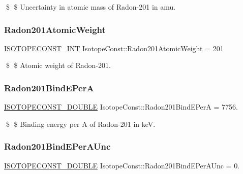 \$ \$ Uncertainty in atomic mass of Radon-\/201 in amu. \mbox{\label{group___isotope_const-_radon-_rn201_gaaece13a99d34e2d724ffe595dbc305bb}} 
\subsubsection{\texorpdfstring{Radon201\+Atomic\+Weight}{Radon201AtomicWeight}}
{\footnotesize\ttfamily \mbox{\hyperlink{group___isotope_const-_macros_ga5f18360b3e99483a35c32d789e62621c}{I\+S\+O\+T\+O\+P\+E\+C\+O\+N\+S\+T\+\_\+\+I\+NT}} Isotope\+Const\+::\+Radon201\+Atomic\+Weight = 201}

\$ \$ Atomic weight of Radon-\/201. \mbox{\label{group___isotope_const-_radon-_rn201_gad0d755e20f09f3078439bc1e324f72b6}} 
\subsubsection{\texorpdfstring{Radon201\+Bind\+E\+PerA}{Radon201BindEPerA}}
{\footnotesize\ttfamily \mbox{\hyperlink{group___isotope_const-_macros_ga8f45a7272ce02c0b4c65c44636ed719a}{I\+S\+O\+T\+O\+P\+E\+C\+O\+N\+S\+T\+\_\+\+D\+O\+U\+B\+LE}} Isotope\+Const\+::\+Radon201\+Bind\+E\+PerA = 7756.}

\$ \$ Binding energy per A of Radon-\/201 in keV. \mbox{\label{group___isotope_const-_radon-_rn201_ga64e6d4c260d751f70d430364d7210352}} 
\subsubsection{\texorpdfstring{Radon201\+Bind\+E\+Per\+A\+Unc}{Radon201BindEPerAUnc}}
{\footnotesize\ttfamily \mbox{\hyperlink{group___isotope_const-_macros_ga8f45a7272ce02c0b4c65c44636ed719a}{I\+S\+O\+T\+O\+P\+E\+C\+O\+N\+S\+T\+\_\+\+D\+O\+U\+B\+LE}} Isotope\+Const\+::\+Radon201\+Bind\+E\+Per\+A\+Unc = 0.}


